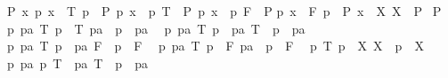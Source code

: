 \begin{isabellebody}
\begin{isamarkuptxt}
  \begin{isabelle}%
\ {}{\isachardot}\ {\isasymAnd}P\ x{\isachardot}\ {\isasymlbrakk}{\isasymAnd}p{\isachardot}\ x\ {\isacharequal}\ {\isacharparenleft}T{\isacharcomma}\ p{\isacharparenright}\ {\isasymLongrightarrow}\ P{\isacharsemicolon}\ {\isasymAnd}p{\isachardot}\ x\ {\isacharequal}\ {\isacharparenleft}p{\isacharcomma}\ T{\isacharparenright}\ {\isasymLongrightarrow}\ P{\isacharsemicolon}\ {\isasymAnd}p{\isachardot}\ x\ {\isacharequal}\ {\isacharparenleft}p{\isacharcomma}\ F{\isacharparenright}\ {\isasymLongrightarrow}\ P{\isacharsemicolon}\isanewline
{}p{\isachardot}\ x\ {\isacharequal}\ {\isacharparenleft}F{\isacharcomma}\ p{\isacharparenright}\ {\isasymLongrightarrow}\ P{\isacharsemicolon}\ x\ {\isacharequal}\ {\isacharparenleft}X{\isacharcomma}\ X{\isacharparenright}\ {\isasymLongrightarrow}\ P{\isasymrbrakk}\isanewline
{}\ P\isanewline
\ {}{\isachardot}\ {\isasymAnd}p\ pa{\isachardot}\ {\isacharparenleft}T{\isacharcomma}\ p{\isacharparenright}\ {\isacharequal}\ {\isacharparenleft}T{\isacharcomma}\ pa{\isacharparenright}\ {\isasymLongrightarrow}\ p\ {\isacharequal}\ pa\isanewline
\ {}{\isachardot}\ {\isasymAnd}p\ pa{\isachardot}\ {\isacharparenleft}T{\isacharcomma}\ p{\isacharparenright}\ {\isacharequal}\ {\isacharparenleft}pa{\isacharcomma}\ T{\isacharparenright}\ {\isasymLongrightarrow}\ p\ {\isacharequal}\ pa\isanewline
\ {}{\isachardot}\ {\isasymAnd}p\ pa{\isachardot}\ {\isacharparenleft}T{\isacharcomma}\ p{\isacharparenright}\ {\isacharequal}\ {\isacharparenleft}pa{\isacharcomma}\ F{\isacharparenright}\ {\isasymLongrightarrow}\ p\ {\isacharequal}\ F\isanewline
\ {}{\isachardot}\ {\isasymAnd}p\ pa{\isachardot}\ {\isacharparenleft}T{\isacharcomma}\ p{\isacharparenright}\ {\isacharequal}\ {\isacharparenleft}F{\isacharcomma}\ pa{\isacharparenright}\ {\isasymLongrightarrow}\ p\ {\isacharequal}\ F\isanewline
\ {}{\isachardot}\ {\isasymAnd}p{\isachardot}\ {\isacharparenleft}T{\isacharcomma}\ p{\isacharparenright}\ {\isacharequal}\ {\isacharparenleft}X{\isacharcomma}\ X{\isacharparenright}\ {\isasymLongrightarrow}\ p\ {\isacharequal}\ X\isanewline
\ {}{\isachardot}\ {\isasymAnd}p\ pa{\isachardot}\ {\isacharparenleft}p{\isacharcomma}\ T{\isacharparenright}\ {\isacharequal}\ {\isacharparenleft}pa{\isacharcomma}\ T{\isacharparenright}\ {\isasymLongrightarrow}\ p\ {\isacharequal}\ pa\isanewline

\end{isabelle}
\end{isamarkuptxt}
\end{isabellebody}
